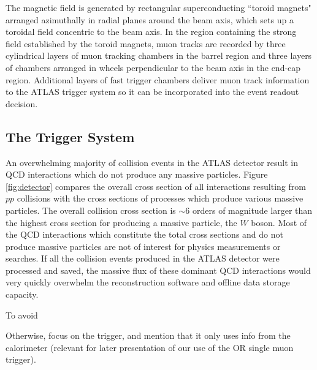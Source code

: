 The magnetic field is generated by rectangular superconducting ``toroid magnets" arranged azimuthally in radial planes around the beam axis, which sets up a toroidal field concentric to the beam axis. In the region containing the strong field established by the toroid magnets, muon tracks are recorded by three cylindrical layers of muon tracking chambers in the barrel region and three layers of chambers arranged in wheels perpendicular to the beam axis in the end-cap region. Additional layers of fast trigger chambers deliver muon track information to the ATLAS trigger system so it can be incorporated into the event readout decision. 

\subsection{The Trigger System}

An overwhelming majority of collision events in the ATLAS detector result in QCD interactions which do not produce any massive particles. Figure \ref{fig:detector} compares the overall cross section of all interactions resulting from $pp$ collisions with the cross sections of processes which produce various massive particles. The overall collision cross section is $\sim$6 orders of magnitude larger than the highest cross section for producing a massive particle, the $W$ boson. Most of the QCD interactions which constitute the total cross sections and do not produce massive particles are not of interest for physics measurements or searches. If all the collision events produced in the ATLAS detector were processed and saved, the massive flux of these dominant QCD interactions would very quickly overwhelm the reconstruction software and offline data storage capacity. 

To avoid


Otherwise, focus on the \met trigger, and mention that it only uses info from the calorimeter (relevant for later presentation of our use of the \met OR single muon trigger).


